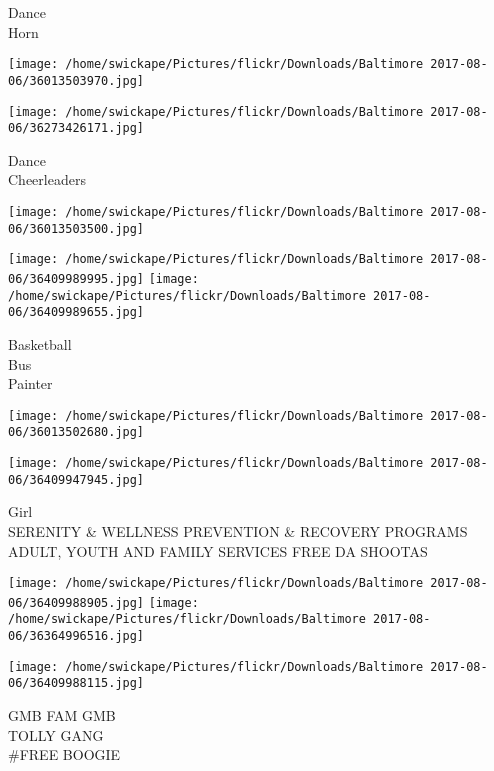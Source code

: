 \documentclass[10pt,letterpaper]{article}
\begin{document}
Dance\\
Horn\\
\pagebreak

\texttt{[image: /home/swickape/Pictures/flickr/Downloads/Baltimore 2017-08-06/36013503970.jpg]}

\vspace{0.25in}
\texttt{[image: /home/swickape/Pictures/flickr/Downloads/Baltimore 2017-08-06/36273426171.jpg]}

Dance\\
Cheerleaders\\
\pagebreak

\texttt{[image: /home/swickape/Pictures/flickr/Downloads/Baltimore 2017-08-06/36013503500.jpg]}

\vspace{0.25in}
\texttt{[image: /home/swickape/Pictures/flickr/Downloads/Baltimore 2017-08-06/36409989995.jpg]}
\texttt{[image: /home/swickape/Pictures/flickr/Downloads/Baltimore 2017-08-06/36409989655.jpg]}

Basketball\\
Bus\\
Painter\\
\pagebreak

\texttt{[image: /home/swickape/Pictures/flickr/Downloads/Baltimore 2017-08-06/36013502680.jpg]}

\vspace{0.25in}
\texttt{[image: /home/swickape/Pictures/flickr/Downloads/Baltimore 2017-08-06/36409947945.jpg]}

Girl\\
SERENITY \& WELLNESS PREVENTION \& RECOVERY PROGRAMS ADULT, YOUTH AND FAMILY SERVICES FREE DA SHOOTAS\\
\pagebreak

\texttt{[image: /home/swickape/Pictures/flickr/Downloads/Baltimore 2017-08-06/36409988905.jpg]}
\texttt{[image: /home/swickape/Pictures/flickr/Downloads/Baltimore 2017-08-06/36364996516.jpg]}

\vspace{0.25in}
\texttt{[image: /home/swickape/Pictures/flickr/Downloads/Baltimore 2017-08-06/36409988115.jpg]}

GMB FAM GMB\\
TOLLY GANG\\
\#FREE BOOGIE\\
\pagebreak
\end{document}

